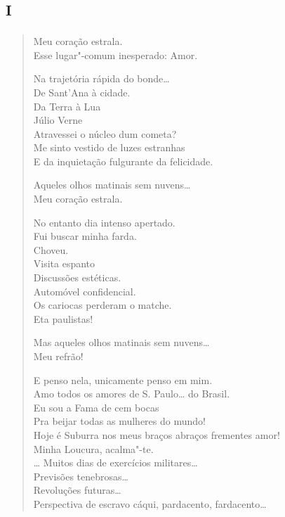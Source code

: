 {\chapter[«Meu coração estrala»]{\textsc{i}}

\begin{verse}
Meu coração estrala.\\
Esse lugar"-comum inesperado: Amor.

\quad\quad\quad{}Na trajetória rápida do bonde\ldots{}\\
\quad\quad\quad\quad{}De Sant'Ana à cidade.\\
\quad\quad\quad\quad\quad{}Da Terra à Lua\\
\quad\quad\quad\quad\quad\quad{}Júlio Verne\\
\quad\quad\quad\quad\quad{}Atravessei o núcleo dum cometa?\\
\quad\quad\quad\quad{}Me sinto vestido de luzes estranhas\\
\quad\quad\quad\quad{}E da inquietação fulgurante da felicidade.

Aqueles olhos matinais sem nuvens\ldots{}\\
Meu coração estrala.

No entanto dia intenso apertado.\\
\quad\quad\quad\quad{}Fui buscar minha farda.\\
\quad\quad\quad\quad{}Choveu.\\
\quad\quad\quad\quad{}Visita espanto\\
\quad\quad\quad\quad{}Discussões estéticas.\\
\quad\quad\quad\quad{}Automóvel confidencial.\\
\quad\quad\quad\quad{}Os cariocas perderam o matche.\\
\quad\quad\quad\quad{}Eta paulistas!

Mas aqueles olhos matinais sem nuvens\ldots{}\\
Meu refrão!

E penso nela, unicamente penso em mim.\\
Amo todos os amores de S. Paulo\ldots{} do Brasil.\\
Eu sou a Fama de cem bocas\\
Pra beijar todas as mulheres do mundo!\\
Hoje é Suburra nos meus braços abraços frementes amor!\\
Minha Loucura, acalma"-te.\\
\ldots{} Muitos dias de exercícios militares\ldots{}\\
\quad\quad\quad\quad{}Previsões tenebrosas\ldots{}\\
\quad\quad\quad\quad\quad\quad{}Revoluções futuras\ldots{}\\
Perspectiva de escravo cáqui, pardacento, fardacento\ldots{}\\


\end{verse}}
